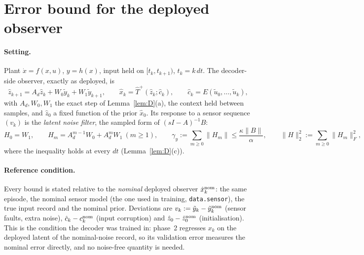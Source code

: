 
\section{Error bound for the deployed observer}\label{sec:m3}

\paragraph{Setting.} Plant $\dot x=f(x,u)$, $y=h(x)$, input held on $[t_k,t_{k+1})$, $t_k=k\,dt$.
The decoder-side observer, exactly as deployed, is
\begin{equation}\label{eq:m3-obs}
\hat z_{k+1}=A_d\hat z_k+W_0\tilde y_k+W_1\tilde y_{k+1},\qquad
\hat x_k=\hat T^{+}(\hat z_k;\hat c_k),\qquad \hat c_k=E(\tilde u_0,\dots,\tilde u_k),
\end{equation}
with $A_d,W_0,W_1$ the exact step of Lemma~\ref{lem:D}(a), the context held between samples, and
$\hat z_0$ a fixed function of the prior $\hat x_0$. Its response to a sensor sequence $(v_k)$ is
the \emph{latent noise filter}, the sampled form of $(sI-A)^{-1}B$:
\begin{equation}\label{eq:m3-H}
H_0=W_1,\qquad H_m=A_d^{m-1}W_0+A_d^{m}W_1\ (m\ge1),\qquad
\gamma_y:=\sum_{m\ge0}\|H_m\|\le\frac{\kappa\|B\|}{\alpha},\qquad \|H\|_2^2:=\sum_{m\ge0}\|H_m\|_F^2 ,
\end{equation}
where the inequality holds at every $dt$ (Lemma~\ref{lem:D}(c)).

\paragraph{Reference condition.} Every bound is stated relative to the \emph{nominal} deployed
observer $\hat x^{\rm nom}_k$: the same episode, the nominal sensor model (the one used in training,
\texttt{data.sensor}), the true input record and the nominal prior. Deviations are
$v_k:=\tilde y_k-\tilde y^{\rm nom}_k$ (sensor faults, extra noise), $\hat c_k-c^{\rm nom}_k$ (input
corruption) and $\hat z_0-\hat z^{\rm nom}_0$ (initialisation). This is the condition the decoder
was trained in: phase~2 regresses $x_k$ on the deployed latent of the nominal-noise record, so its
validation error measures the nominal error directly, and no noise-free quantity is needed.


